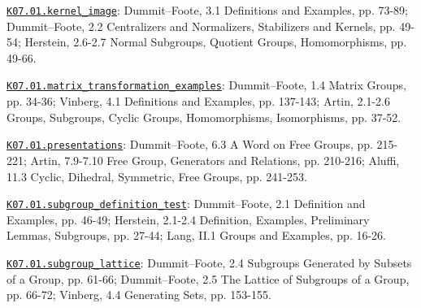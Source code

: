 \par\smallskip\noindent\hypertarget{src:K07.01.kernel_image}{}\label{src:K07.01.kernel_image}\hyperref[K07.01.kernel_image]{\texttt{K07.01.kernel\_image}}: Dummit--Foote, 3.1 Definitions and Examples, pp. 73-89; Dummit--Foote, 2.2 Centralizers and Normalizers, Stabilizers and Kernels, pp. 49-54; Herstein, 2.6-2.7 Normal Subgroups, Quotient Groups, Homomorphisms, pp. 49-66.
\par\smallskip\noindent\hypertarget{src:K07.01.matrix_transformation_examples}{}\label{src:K07.01.matrix_transformation_examples}\hyperref[K07.01.matrix_transformation_examples]{\texttt{K07.01.matrix\_transformation\_examples}}: Dummit--Foote, 1.4 Matrix Groups, pp. 34-36; Vinberg, 4.1 Definitions and Examples, pp. 137-143; Artin, 2.1-2.6 Groups, Subgroups, Cyclic Groups, Homomorphisms, Isomorphisms, pp. 37-52.
\par\smallskip\noindent\hypertarget{src:K07.01.presentations}{}\label{src:K07.01.presentations}\hyperref[K07.01.presentations]{\texttt{K07.01.presentations}}: Dummit--Foote, 6.3 A Word on Free Groups, pp. 215-221; Artin, 7.9-7.10 Free Group, Generators and Relations, pp. 210-216; Aluffi, 11.3 Cyclic, Dihedral, Symmetric, Free Groups, pp. 241-253.
\par\smallskip\noindent\hypertarget{src:K07.01.subgroup_definition_test}{}\label{src:K07.01.subgroup_definition_test}\hyperref[K07.01.subgroup_definition_test]{\texttt{K07.01.subgroup\_definition\_test}}: Dummit--Foote, 2.1 Definition and Examples, pp. 46-49; Herstein, 2.1-2.4 Definition, Examples, Preliminary Lemmas, Subgroups, pp. 27-44; Lang, II.1 Groups and Examples, pp. 16-26.
\par\smallskip\noindent\hypertarget{src:K07.01.subgroup_lattice}{}\label{src:K07.01.subgroup_lattice}\hyperref[K07.01.subgroup_lattice]{\texttt{K07.01.subgroup\_lattice}}: Dummit--Foote, 2.4 Subgroups Generated by Subsets of a Group, pp. 61-66; Dummit--Foote, 2.5 The Lattice of Subgroups of a Group, pp. 66-72; Vinberg, 4.4 Generating Sets, pp. 153-155.
